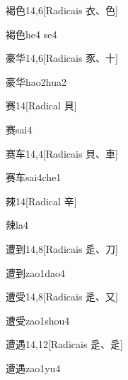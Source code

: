 \begin{entry}{褐色}{14,6}[Radicais ⾐、⾊]
  \begin{phonetics}{褐色}{he4 se4}
  \end{phonetics}
\end{entry}

\begin{entry}{豪华}{14,6}[Radicais ⾗、⼗]
  \begin{phonetics}{豪华}{hao2hua2}
  \end{phonetics}
\end{entry}

\begin{entry}{赛}{14}[Radical ⾙]
  \begin{phonetics}{赛}{sai4}
  \end{phonetics}
\end{entry}

\begin{entry}{赛车}{14,4}[Radicais ⾙、⾞]
  \begin{phonetics}{赛车}{sai4che1}
  \end{phonetics}
\end{entry}

\begin{entry}{辣}{14}[Radical ⾟]
  \begin{phonetics}{辣}{la4}
  \end{phonetics}
\end{entry}

\begin{entry}{遭到}{14,8}[Radicais ⾡、⼑]
  \begin{phonetics}{遭到}{zao1dao4}
  \end{phonetics}
\end{entry}

\begin{entry}{遭受}{14,8}[Radicais ⾡、⼜]
  \begin{phonetics}{遭受}{zao1shou4}
  \end{phonetics}
\end{entry}

\begin{entry}{遭遇}{14,12}[Radicais ⾡、⾡]
  \begin{phonetics}{遭遇}{zao1yu4}
  \end{phonetics}
\end{entry}

